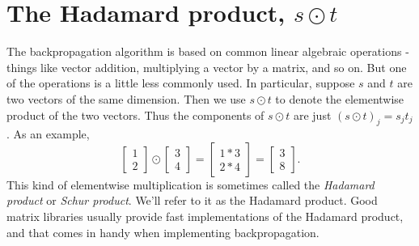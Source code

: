 \documentclass[a4paper,twoside,10pt]{book}
\begin{document}
\section{The Hadamard product, $s\odot{}t$}
The backpropagation algorithm is based on common linear algebraic operations - things like vector addition, multiplying a vector by a matrix, and so on. But one of the operations is a little less commonly used. In particular, suppose $s$ and $t$ are two vectors of the same dimension. Then we use $s\odot{}t$ to denote the elementwise product of the two vectors. Thus the components of $s\odot{}t$ are just $(s \odot t)_j = s_j t_j$. As an example,
\begin{equation}
	\left[\begin{array}{c} 1 \\ 2 \end{array}\right] 
	\odot \left[\begin{array}{c} 3 \\ 4\end{array} \right]
	= \left[ \begin{array}{c} 1 * 3 \\ 2 * 4 \end{array} \right]
	= \left[ \begin{array}{c} 3 \\ 8 \end{array} \right].
	\label{eq:28}
\end{equation}
This kind of elementwise multiplication is sometimes called the \textit{Hadamard product} or \textit{Schur product}. We'll refer to it as the Hadamard product. Good matrix libraries usually provide fast implementations of the Hadamard product, and that comes in handy when implementing backpropagation.
%
%
\end{document}
